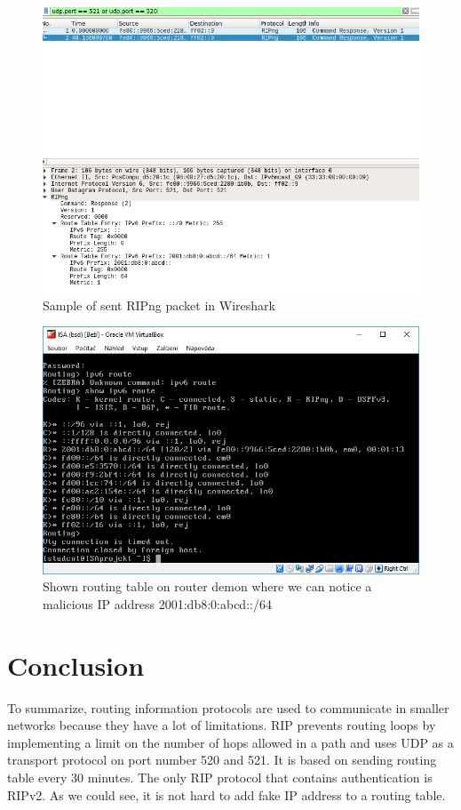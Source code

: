 \documentclass[11pt,a4paper]{article}
\begin{document}
\begin{figure}[H]
	
	\includegraphics[width=12cm]{img/sendripng.png} 
	\caption{Sample of sent RIPng packet in Wireshark}
	\label{fig:send_packet}

\end{figure}

\begin{figure}[H]
	
	\includegraphics[width=17cm]{img/bsd.png} 
	\caption{Shown routing table on router demon where we can notice a malicious IP address 2001:db8:0:abcd::/64 }
	\label{fig:bsdroute}

\end{figure}

\section{Conclusion}
To summarize, routing information protocols are used to communicate in smaller networks because they have a lot of limitations. RIP prevents routing loops by implementing a limit on the number of hops allowed in a path and uses UDP as a transport protocol on port number 520 and 521. It is based on sending routing table every 30 minutes. The only RIP protocol that contains authentication is RIPv2. As we could see, it is not hard to add fake IP address to a routing table.  
\end{document}
